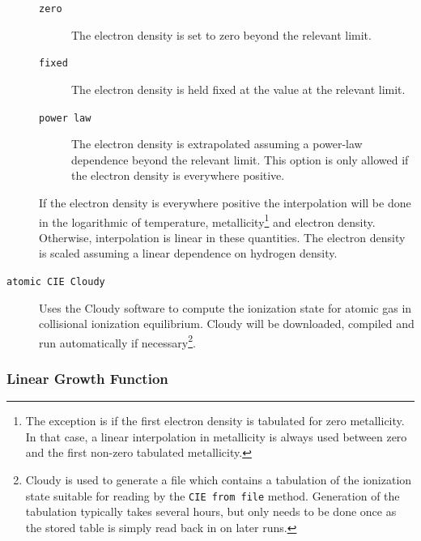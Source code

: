 \begin{description}
 \begin{description}
  \item[{\tt zero}] The electron density is set to zero beyond the relevant limit.
  \item[{\tt fixed}] The electron density is held fixed at the value at the relevant limit.
  \item[{\tt power law}] The electron density is extrapolated assuming a power-law dependence beyond the relevant limit. This option is only allowed if the electron density is everywhere positive.
 \end{description}
 If the electron density is everywhere positive the interpolation will be done in the logarithmic of temperature, metallicity\footnote{The exception is if the first electron density is tabulated for zero metallicity. In that case, a linear interpolation in metallicity is always used between zero and the first non-zero tabulated metallicity.} and electron density. Otherwise, interpolation is linear in these quantities. The electron density is scaled assuming a linear dependence on hydrogen density.
 \item [{\tt atomic CIE Cloudy}] Uses the {\sc Cloudy} software to compute the ionization state for atomic gas in collisional ionization equilibrium. {\sc Cloudy} will be downloaded, compiled and run automatically if necessary\footnote{{\sc Cloudy} is used to generate a file which contains a tabulation of the ionization state suitable for reading by the {\tt CIE from file} method. Generation of the tabulation typically takes several hours, but only needs to be done once as the stored table is simply read back in on later runs.}.
\end{description}

\subsubsection{Linear Growth Function}

